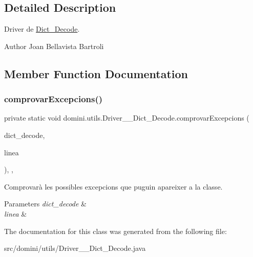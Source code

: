 \subsection{Detailed Description}
Driver de \hyperlink{classdomini_1_1utils_1_1Dict__Decode}{Dict\+\_\+\+Decode}. 

\begin{DoxyAuthor}{Author}
Joan Bellavista Bartroli 
\end{DoxyAuthor}


\subsection{Member Function Documentation}
\mbox{\label{classdomini_1_1utils_1_1Driver____Dict__Decode_a41ddfd0f1473de9401aa7860cff2f3e8}} 
\subsubsection{\texorpdfstring{comprovar\+Excepcions()}{comprovarExcepcions()}}
{\footnotesize\ttfamily private static void domini.\+utils.\+Driver\+\_\+\+\_\+\+Dict\+\_\+\+Decode.\+comprovar\+Excepcions (\begin{DoxyParamCaption}\item[{\hyperlink{classdomini_1_1utils_1_1Dict__Decode}{Dict\+\_\+\+Decode}}]{dict\+\_\+decode,  }\item[{String}]{linea }\end{DoxyParamCaption})\hspace{0.3cm}{\ttfamily [inline]}, {\ttfamily [static]}, {\ttfamily [private]}}



Comprovarà les possibles excepcions que puguin apareixer a la classe. 


\begin{DoxyParams}{Parameters}
{\em dict\+\_\+decode} & \\
\hline
{\em linea} & \\
\hline
\end{DoxyParams}


The documentation for this class was generated from the following file\+:\begin{DoxyCompactItemize}
\item 
src/domini/utils/Driver\+\_\+\+\_\+\+Dict\+\_\+\+Decode.\+java\end{DoxyCompactItemize}
